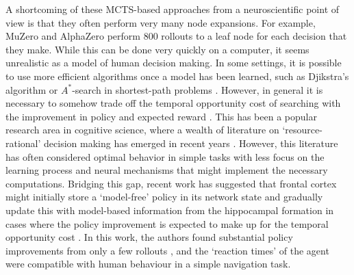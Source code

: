 A shortcoming of these MCTS-based approaches from a neuroscientific point of view is that they often perform very many node expansions.
For example, MuZero and AlphaZero perform 800 rollouts to a leaf node for each decision that they make.
While this can be done very quickly on a computer, it seems unrealistic as a model of human decision making.
In some settings, it is possible to use more efficient algorithms once a model has been learned, such as Djikstra's algorithm or $A^*$-search in shortest-path problems \citep{hart1968formal}.
However, in general it is necessary to somehow trade off the temporal opportunity cost of searching with the improvement in policy and expected reward \citep{botvinick2014computational}.
This has been a popular research area in cognitive science, where a wealth of literature on `resource-rational' decision making has emerged in recent years \citep{griffiths2019doing,callaway2022rational}.
However, this literature has often considered optimal behavior in simple tasks with less focus on the learning process and neural mechanisms that might implement the necessary computations.
Bridging this gap, recent work has suggested that frontal cortex might initially store a `model-free' policy in its network state and gradually update this with model-based information from the hippocampal formation in cases where the policy improvement is expected to make up for the temporal opportunity cost \citep{jensen2023recurrent}.
In this work, the authors found substantial policy improvements from only a few rollouts \citep{vul2014one}, and the `reaction times' of the agent were compatible with human behaviour in a simple navigation task.

